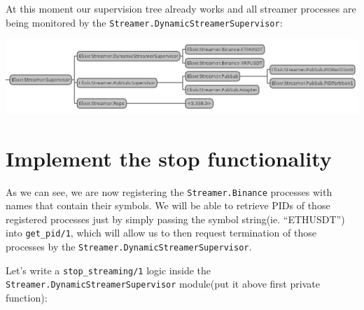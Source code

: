 \documentclass[
  oneside]{book}
\begin{document}
At this moment our supervision tree already works and all streamer processes are being monitored by the \texttt{Streamer.DynamicStreamerSupervisor}:

\begin{center}\includegraphics[width=1\linewidth]{images/chapter_11_03_first_sup_tree} \end{center}

\section{Implement the stop functionality}\label{implement-the-stop-functionality}

As we can see, we are now registering the \texttt{Streamer.Binance} processes with names that contain their symbols. We will be able to retrieve PIDs of those registered processes just by simply passing the symbol string(ie. ``ETHUSDT'') into \texttt{get\_pid/1}, which will allow us to then request termination of those processes by the \texttt{Streamer.DynamicStreamerSupervisor}.

Let's write a \texttt{stop\_streaming/1} logic inside the \texttt{Streamer.DynamicStreamerSupervisor} module(put it above first private function):
\end{document}
